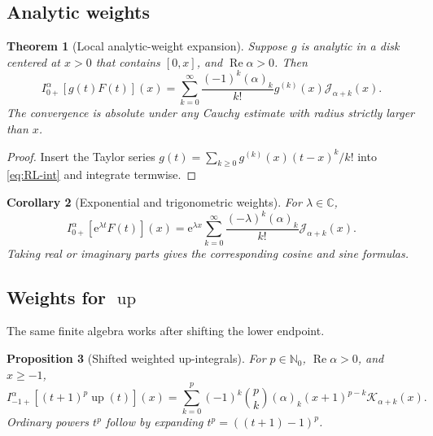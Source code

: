 \documentclass[11pt]{article}
\newtheorem{theorem}{Theorem}[section]
\newtheorem{proposition}[theorem]{Proposition}
\newtheorem{corollary}[theorem]{Corollary}
\theoremstyle{definition}
\theoremstyle{remark}
\newcommand{\C}{\mathbb C}
\newcommand{\N}{\mathbb N}
\newcommand{\e}{\mathrm e}
\newcommand{\Up}{\operatorname{up}}
\newcommand{\Ree}{\operatorname{Re}}
\newcommand{\poch}[2]{(#1)_{#2}}
\newcommand{\J}{\mathcal J}
\newcommand{\K}{\mathcal K}
\begin{document}
\subsection{Analytic weights}

\begin{theorem}[Local analytic-weight expansion]
\label{thm:analytic-weight}
Suppose $g$ is analytic in a disk centered at $x>0$ that contains $[0,x]$, and
$\Ree\alpha>0$.  Then
\begin{equation}
 I_{0+}^{\alpha}[g(t)F(t)](x)
 =\sum_{k=0}^{\infty}\frac{(-1)^k\poch{\alpha}{k}}{k!}
 g^{(k)}(x)\J_{\alpha+k}(x).
 \label{eq:analytic-weight}
\end{equation}
The convergence is absolute under any Cauchy estimate with radius strictly larger than $x$.
\end{theorem}

\begin{proof}
Insert the Taylor series
$g(t)=\sum_{k\ge0}g^{(k)}(x)(t-x)^k/k!$ into \cref{eq:RL-int} and integrate termwise.
\end{proof}

\begin{corollary}[Exponential and trigonometric weights]
For $\lambda\in\C$,
\begin{equation}
 I_{0+}^{\alpha}[\e^{\lambda t}F(t)](x)
 =\e^{\lambda x}\sum_{k=0}^{\infty}
 \frac{(-\lambda)^k\poch{\alpha}{k}}{k!}\J_{\alpha+k}(x).
 \label{eq:exponential-weight}
\end{equation}
Taking real or imaginary parts gives the corresponding cosine and sine formulas.
\end{corollary}

\subsection{Weights for $\Up$}

The same finite algebra works after shifting the lower endpoint.

\begin{proposition}[Shifted weighted up-integrals]
\label{prop:up-weighted}
For $p\in\N_0$, $\Ree\alpha>0$, and $x\ge-1$,
\begin{equation}
 I_{-1+}^{\alpha}[(t+1)^p\Up(t)](x)
 =\sum_{k=0}^{p}(-1)^k\binom pk\poch{\alpha}{k}
 (x+1)^{p-k}\K_{\alpha+k}(x).
 \label{eq:up-weighted}
\end{equation}
Ordinary powers $t^p$ follow by expanding $t^p=((t+1)-1)^p$.
\end{proposition}
\end{document}
